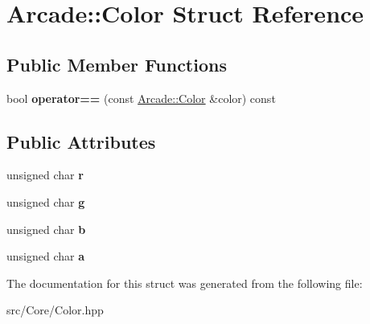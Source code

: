 \hypertarget{struct_arcade_1_1_color}{}\section{Arcade\+:\+:Color Struct Reference}
\label{struct_arcade_1_1_color}
\subsection*{Public Member Functions}
\begin{DoxyCompactItemize}
\item 
\mbox{\label{struct_arcade_1_1_color_a1df155f54a5207b6d0811a83535c2f21}} 
bool {\bfseries operator==} (const \mbox{\hyperlink{struct_arcade_1_1_color}{Arcade\+::\+Color}} \&color) const
\end{DoxyCompactItemize}
\subsection*{Public Attributes}
\begin{DoxyCompactItemize}
\item 
\mbox{\label{struct_arcade_1_1_color_a69e890d930f278b9039426696eecb2de}} 
unsigned char {\bfseries r}
\item 
\mbox{\label{struct_arcade_1_1_color_ad1a83614be521d33f0b9e9a97cd0e8ab}} 
unsigned char {\bfseries g}
\item 
\mbox{\label{struct_arcade_1_1_color_a2354b6d3aa07ce9be05fc17214a476e4}} 
unsigned char {\bfseries b}
\item 
\mbox{\label{struct_arcade_1_1_color_ada05b8d7416a374c717ab7780b61359a}} 
unsigned char {\bfseries a}
\end{DoxyCompactItemize}


The documentation for this struct was generated from the following file\+:\begin{DoxyCompactItemize}
\item 
src/\+Core/Color.\+hpp\end{DoxyCompactItemize}

